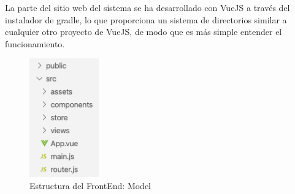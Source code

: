 La parte del sitio web del sistema se ha desarrollado con VueJS a través del instalador de gradle, lo que proporciona un sistema de directorios similar a cualquier otro proyecto de VueJS, de modo que es más simple entender el funcionamiento.

    \begin{figure}[H]
        \centering
        \includegraphics[width=3cm]{./img/web/web.dir.png}
        \caption{Estructura del FrontEnd: Model}
        \label{fig:web.dir}
    \end{figure}

